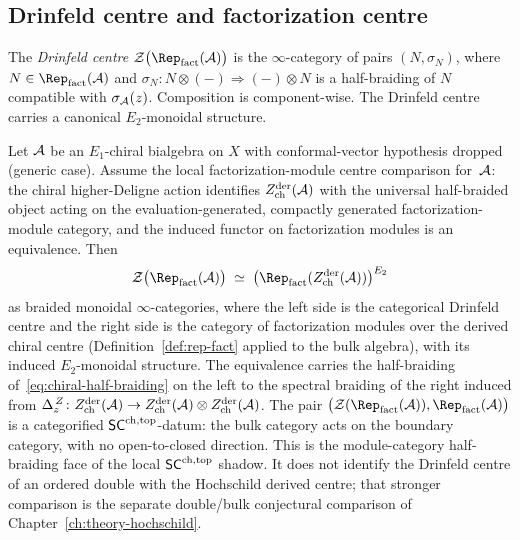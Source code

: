 \subsection{Drinfeld centre and factorization centre}\label{subsec:dcz-vs-fcz}

\begin{definition}
\label{def:drinfeld-centre-rep-fact}%
The \emph{Drinfeld centre}
$\cZ\bigl(\Rep_{\mathrm{fact}}(\cA)\bigr)$ is the $\infty$-category of
pairs $(N,\sigma_N)$, where $N\in\Rep_{\mathrm{fact}}(\cA)$ and
$\sigma_N\colon N\otimes(-)\Rightarrow(-)\otimes N$ is a half-braiding
of $N$ compatible with $\sigma_{\mathcal{A}}(z)$. Composition is component-wise.
The Drinfeld centre carries a canonical $E_2$-monoidal structure.
\end{definition}

\begin{theorem}
\label{thm:drinfeld-centre-sc-face}%
%
Let $\mathcal{A}$ be an $E_1$-chiral bialgebra on $X$ with conformal-vector
hypothesis dropped (generic case). Assume the local
factorization-module centre comparison for~$\mathcal{A}$: the chiral
higher-Deligne action identifies
$Z^{\mathrm{der}}_{\mathrm{ch}}(\mathcal{A})$ with the universal
half-braided object acting on the evaluation-generated,
compactly generated factorization-module category, and the induced
functor on factorization modules is an equivalence. Then
\begin{equation}
 \label{eq:drinfeld-centre-face}
 \cZ\bigl(\Rep_{\mathrm{fact}}(\cA)\bigr)
 \;\simeq\;
 \bigl(\Rep_{\mathrm{fact}}(Z^{\mathrm{der}}_{\mathrm{ch}}(\cA))\bigr)^{E_2}
\end{equation}
as braided monoidal $\infty$-categories, where the left side is the
categorical Drinfeld centre and the right side is the category of
factorization modules over the derived chiral centre
(Definition~\ref{def:rep-fact} applied to the bulk algebra), with
its induced $E_2$-monoidal structure. The equivalence carries the
half-braiding of~\eqref{eq:chiral-half-braiding} on the left to the
spectral braiding of the right induced from
$\Delta_z^{\,Z}\colon Z^{\mathrm{der}}_{\mathrm{ch}}(\mathcal{A})\to
Z^{\mathrm{der}}_{\mathrm{ch}}(\mathcal{A})\otimes Z^{\mathrm{der}}_{\mathrm{ch}}(\mathcal{A})$.
The pair
\(
 \bigl(\cZ(\Rep_{\mathrm{fact}}(\cA)),\Rep_{\mathrm{fact}}(\cA)\bigr)
\)
is a categorified $\mathsf{SC}^{\mathrm{ch},\mathrm{top}}$-datum: the bulk category acts on
the boundary category, with no open-to-closed direction.
This is the module-category half-braiding face of the local
$\mathsf{SC}^{\mathrm{ch},\mathrm{top}}$ shadow. It does not identify the Drinfeld centre of an
ordered double with the Hochschild derived centre; that stronger
comparison is the separate double/bulk conjectural comparison of
Chapter~\ref{ch:theory-hochschild}.
\end{theorem}

